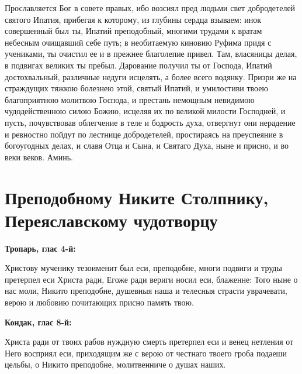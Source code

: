 Прославляется Бог в совете правых, ибо возсиял пред людьми свет добродетелей святого Ипатия, прибегая к которому, из глубины сердца взываем: инок совершенный был ты, Ипатий преподобный, многими трудами к вратам небесным очищавший себе путь; в необитаемую киновию Руфима придя с учениками, ты очистил ее и в прежнее благолепие привел. Там, власяницы делая, в подвигах великих ты пребыл. Дарование получил ты от Господа, Ипатий достохвальный, различные недуги исцелять, а более всего водянку. Призри же на страждущих тяжкою болезнею этой, святый Ипатий, и умилостиви твоею благоприятною молитвою Господа, и престань немощным невидимою чудодейственною силою Божию, исцеляя их по великой милости Господней, и пусть, почувствовав облегчение в теле и бодрость духа, отвергнут они нерадение и ревностно пойдут по лестнице добродетелей, простираясь на преуспеяние в богоугодных делах, и славя Отца и Сына, и Святаго Духа, ныне и присно, и во веки веков. Аминь.
\mychapterending


 

\section{Преподобному Никите Столпнику, Переяславскому чудотворцу}
 


\bfseries Тропарь, глас 4-й:\normalfont{}\nopagebreak


Христову мученику тезоименит был еси, преподобне, многи подвиги и труды претерпел еси Христа ради, Егоже ради вериги носил еси, блаженне: Того ныне о нас моли, Никито преподобне, душевныя наша и телесныя страсти уврачевати, верою и любовию почитающих присно память твою.


\medskip


\bfseries Кондак, глас 8-й:\normalfont{}\nopagebreak


Христа ради от твоих рабов нуждную смерть претерпел еси и венец нетления от Него восприял еси, приходящим же с верою от честнаго твоего гроба подаеши цельбы, о Никито преподобне, молитвенниче о душах наших.


